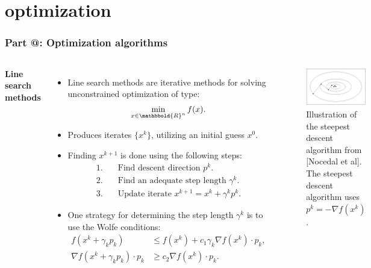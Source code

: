 \documentclass[9pt]{beamer}
\makeatletter
\newcommand*{\rom}[1]{\expandafter\@slowromancap\romannumeral #1@}
\makeatother
\begin{document}
\section{optimization}
\begin{frame}
\frametitle{\textbf{ Part \rom{3}:} Optimization algorithms}
\begin{columns}
\textbf{Line search methods}
\begin{itemize}
\item{Line search methods are iterative methods for solving unconstrained optimization of type:
\begin{align*}
\min_{x\in\mathbbold{R}^n}f(x).
\end{align*}}
\item{Produces iterates $\{x^k\}$, utilizing an initial guess $x^0$.}
\item{Finding $x^{k+1}$ is done using the following steps: {\small
\begin{align*}
1.\quad& \textrm{Find descent direction $p^k$.}\\
2.\quad& \textrm{Find an adequate step length $\gamma^k$.}\\
3.\quad& \textrm{Update iterate $x^{k+1} = x^k +\gamma^k p^k$.}
\end{align*}
}%
}
\item{One strategy for determining the step length $\gamma^k$ is to use the Wolfe conditions:
{\small \begin{align*}
f(x^k + \gamma_kp_k)&\leq f(x^k) + c_1\gamma_k\nabla f(x^k)\cdot p_k, \\
\nabla f(x^k + \gamma_kp_k) \cdot p_k &\geq c_2 \nabla f(x^k)\cdot p_k.
\end{align*}}}
\end{itemize}
\begin{figure}[!h]
\centering
\includegraphics[scale=0.3,angle=90]{SD.png}
\caption{Illustration of the steepest descent algorithm from [Nocedal et al]. The steepest descent algorithm uses $p^k=-\nabla f(x^k)$.}
\end{figure}
\end{columns}
\end{frame}
\end{document}
